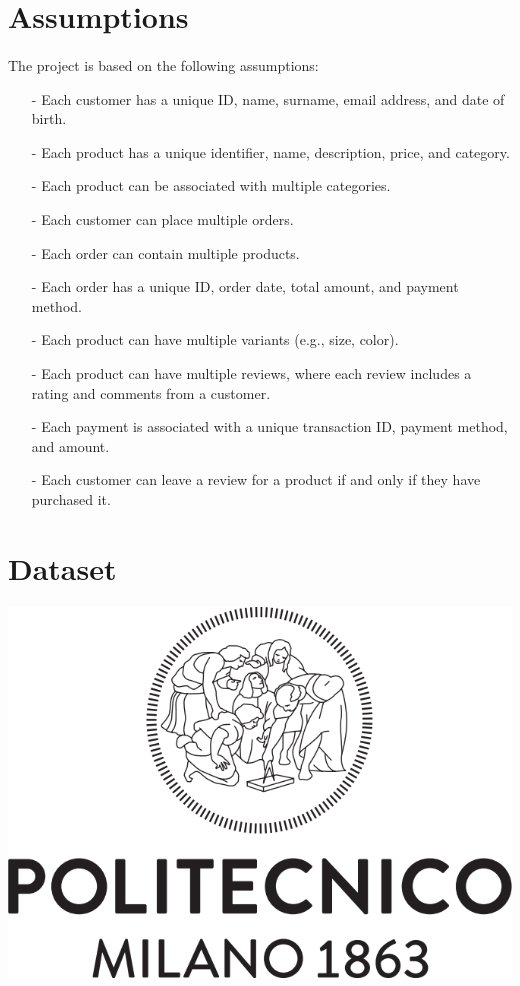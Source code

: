 \documentclass[a4paper,12pt]{article}
\begin{document}
\newpage
\section{Assumptions}
\paragraph{} The project is based on the following assumptions:
\begin{itemize}[noitemsep]
   \item[-] Each customer has a unique ID, name, surname, email address, and date of birth.
   \item[-] Each product has a unique identifier, name, description, price, and category.
   \item[-] Each product can be associated with multiple categories.
   \item[-] Each customer can place multiple orders.
   \item[-] Each order can contain multiple products.
   \item[-] Each order has a unique ID, order date, total amount, and payment method.
   \item[-] Each product can have multiple variants (e.g., size, color).
   \item[-] Each product can have multiple reviews, where each review includes a rating and comments from a customer.
   \item[-] Each payment is associated with a unique transaction ID, payment method, and amount.
   \item[-] Each customer can leave a review for a product if and only if they have purchased it.
\end{itemize}

\clearpage
\section{Dataset}
\paragraph{}
	\begin{center}
 		\includegraphics[width = 15 cm]{polilogo.png}
	\end{center}
\end{document}
